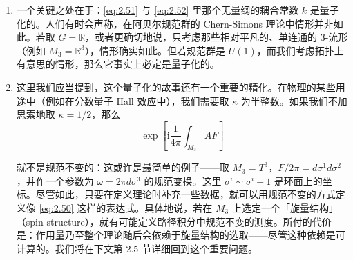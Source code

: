 
\begin{enumerate}
  \item 一个关键之处在于：\eqref{eq:2.51} 与 \eqref{eq:2.52} 里那个无量纲的耦合常数 $k$ 是量子化的。人们有时会声称，在阿贝尔规范群的 Chern-Simons 理论中情形并非如此。若取 $G=\mathbb{R}$，或者更确切地说，只考虑那些相对平凡的、单连通的 3-流形（例如 $M_3=\mathbb{R}^3$），情形确实如此。但若规范群是 $U(1)$，而我们考虑拓扑上有意思的情形，那么它事实上必定是量子化的。


  \item 这里我们应当提到，这个量子化的故事还有一个重要的精化。在物理的某些用途中（例如在分数量子 Hall 效应中），我们需要取 $\kappa$ 为半整数。如果我们不加思索地取 $\kappa=1/2$，那么
\begin{equation}
  \exp\left[\mathrm{i}\frac{1}{4\pi}\int_{M_3}AF\right]
  \tag{2.50}
  \label{eq:2.50}
\end{equation}

就不是规范不变的：这或许是最简单的例子——取 $M_3=T^3$，$F/2\pi=d\sigma^{1}d\sigma^{2}$，并作一个参数为 $\omega=2\pi d\sigma^{3}$ 的规范变换。这里 $\sigma^{i}\sim\sigma^{i}+1$ 是环面上的坐标。尽管如此，只要在定义理论时补充一些数据，就可以用规范不变的方式定义像 \eqref{eq:2.50} 这样的表达式。具体地说，若在 $M_3$ 上选定一个「旋量结构」（spin structure），就有可能定义路径积分中规范不变的测度。所付的代价是：作用量乃至整个理论随后会依赖于旋量结构的选取——尽管这种依赖是可计算的。我们将在下文第 2.5 节详细回到这个重要问题。
\end{enumerate}

